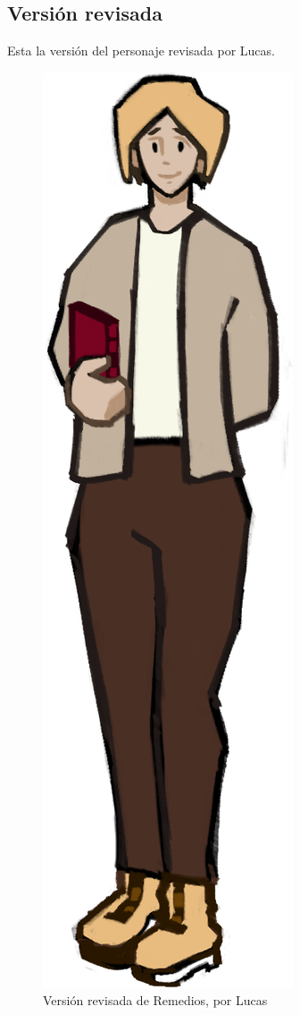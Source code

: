 \documentclass[12pt]{article}
\begin{document}
    \newpage
    \subsection{Versión revisada}
        Esta la versión del personaje revisada por Lucas.
        \begin{figure}[H]
            \centering
            \includegraphics[height=0.8\textheight]{imgs/Remedios.png}
            \caption{Versión revisada de Remedios, por Lucas}
            \label{fig:remedios_final}
        \end{figure}
\end{document}

